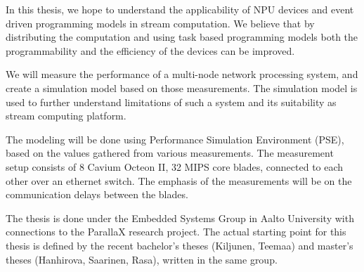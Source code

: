 In this thesis, we hope to understand the applicability of NPU devices and event driven programming models in stream computation. We believe that by distributing the computation and using task based programming models both the programmability and the efficiency of the devices can be improved.

We will measure the performance of a multi-node network processing system, and create a simulation model based on those measurements. The simulation model is used to further understand limitations of such a system and its suitability as stream computing platform.

The modeling will be done using Performance Simulation Environment (PSE), based on the values gathered from various measurements. The measurement setup consists of 8 Cavium Octeon II, 32 MIPS core blades, connected to each other over an ethernet switch. The emphasis of the measurements will be on the communication delays between the blades.

The thesis is done under the Embedded Systems Group in Aalto University with connections to the ParallaX research project. The actual starting point for this thesis is defined by the recent bachelor's theses (Kiljunen, Teemaa) and master's theses (Hanhirova, Saarinen, Rasa), written in the same group.

